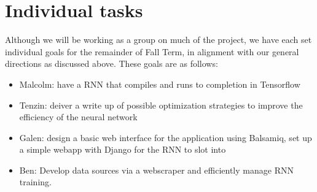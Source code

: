 \section{Individual tasks}\label{sec:indiv}
Although we will be working as a group on much of the project, we have each set
individual goals for the remainder of Fall Term, in alignment with our general
directions as discussed above. These goals are as follows:
\begin{itemize}
  \item Malcolm: have a RNN that compiles and runs to completion in Tensorflow
  \item Tenzin: deiver a write up of  possible optimization strategies to improve the efficiency of the neural network
  \item Galen: design a basic web interface for the application using Balsamiq,
        set up a simple webapp with Django for the RNN to slot into
  \item Ben: Develop data sources via a webscraper and efficiently manage RNN
  training.
\end{itemize}
